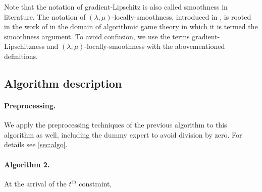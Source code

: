 %

Note that the notation of gradient-Lipschitz is also called smoothness in literature. The notation of $(\lambda,\mu)$-locally-smoothness, introduced in \cite{Thang20:Online-Primal-Dual}, is rooted in the work of \cite{Roughgarden15:Intrinsic-Robustness}
in the domain of algorithmic game theory in which it is termed the smoothness argument.
To avoid confusion, we use the terms gradient-Lipschitzness and $(\lambda,\mu)$-locally-smoothness with the abovementioned definitions.

\subsection{Algorithm description}

\paragraph{Preprocessing.} We apply the preprocessing techniques of the previous algorithm to this algorithm as well, including the dummy expert to avoid division by zero. For details see \cref{sec:algo}.


\paragraph{Algorithm 2.} \label{algo-convex}
At the arrival of the $t^{\text{th}}$ constraint,

